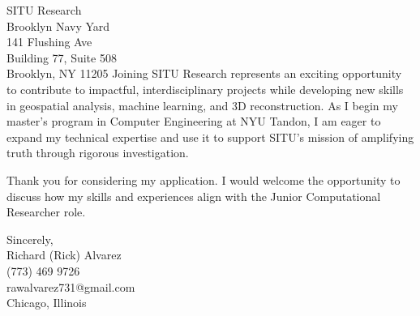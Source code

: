 \documentclass[a4paper,10pt]{letter}
\begin{document}
\begin{letter}{SITU Research \\
Brooklyn Navy Yard \\
141 Flushing Ave \\
Building 77, Suite 508 \\
Brooklyn, NY 11205 }
Joining SITU Research represents an exciting opportunity to contribute to impactful, interdisciplinary projects while developing new skills in geospatial analysis, machine learning, and 3D reconstruction. As I begin my master’s program in Computer Engineering at NYU Tandon, I am eager to expand my technical expertise and use it to support SITU’s mission of amplifying truth through rigorous investigation.  

Thank you for considering my application. I would welcome the opportunity to discuss how my skills and experiences align with the Junior Computational Researcher role.  

\vspace{1em}

Sincerely, \\
Richard (Rick) Alvarez \\
(773) 469 9726 \\
rawalvarez731@gmail.com \\
Chicago, Illinois

\end{letter}
\end{document}
